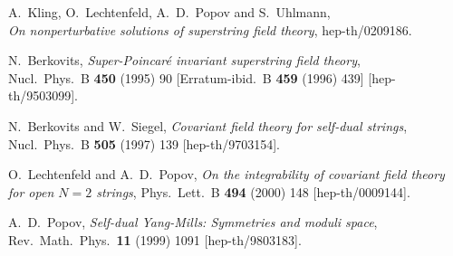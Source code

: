 \documentclass[a4paper,11pt,english]{article}
\numberwithin{equation}{section}
\renewcommand{\=}{\ =\ }
\begin{document}
\begin{thebibliography}{99}
         A.~Kling, O.~Lechtenfeld, A.~D.~Popov and S.~Uhlmann,\\
         {\em On nonperturbative solutions of superstring field theory},
         hep-th/0209186.

         N.~Berkovits,
         {\em Super-Poincar\'e invariant superstring field theory},\\
         Nucl.\ Phys.\ B {\bf 450} (1995) 90
         [Erratum-ibid.\ B {\bf 459} (1996) 439]
         [hep-th/9503099].

	 N.~Berkovits and W.~Siegel,
	 {\em Covariant field theory for self-dual strings},\\
	 Nucl.\ Phys.\ B {\bf 505} (1997) 139
	 [hep-th/9703154].

         O.~Lechtenfeld and A.~D.~Popov,
         {\em On the integrability of covariant field theory for 
              open $N{=}2$ strings},
         Phys.\ Lett.\ B {\bf 494} (2000) 148
         [hep-th/0009144].

         A.~D.~Popov,
         {\em Self-dual Yang-Mills: Symmetries and moduli space},\\
         Rev.\ Math.\ Phys.\  {\bf 11} (1999) 1091
         [hep-th/9803183].

\end{thebibliography}
\end{document}
